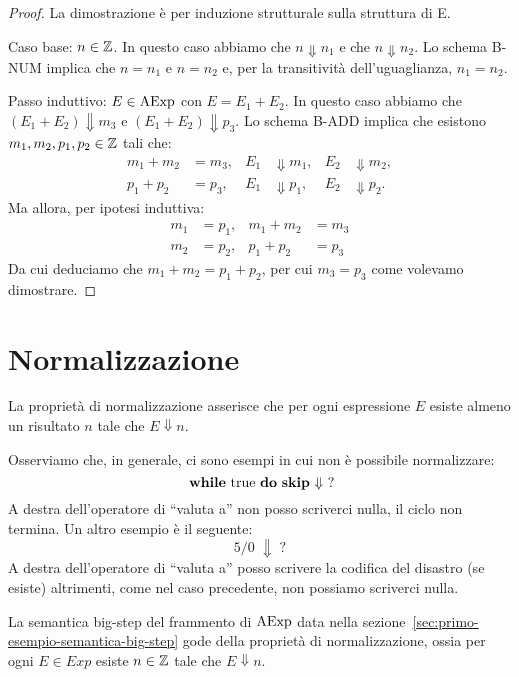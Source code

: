 \begin{proof}
La dimostrazione è per induzione strutturale sulla struttura di E.

Caso base: $n \in \mathbb{Z}$.
In questo caso abbiamo che $n \Downarrow n_1$ e che $n \Downarrow n_2$.
Lo schema B-NUM implica che $n = n_1$ e $n = n_2$ e,
per la transitività dell'uguaglianza, $n_1 = n_2$.

Passo induttivo: $E \in \mathrm{AExp}$ con $E = E_1 + E_2$.
In questo caso abbiamo che $(E_1 + E_2) \Downarrow m_3$
e $(E_1 + E_2) \Downarrow p_3$.
Lo schema B-ADD implica che esistono
$m_1, m_2, p_1, p_2 \in \mathbb{Z}$ tali che:
\begin{align*}
  m_1 + m_2 &= m_3, & E_1 &\Downarrow m_1, & E_2 &\Downarrow m_2, \\
  p_1 + p_2 &= p_3, & E_1 &\Downarrow p_1, & E_2 &\Downarrow p_2.
\end{align*}
Ma allora, per ipotesi induttiva:
\begin{align*}
m_1 &= p_1, & m_1+m_2 &= m_3 \\
m_2 &= p_2, & p_1 + p_2 &= p_3
\end{align*}
Da cui deduciamo che $ m_1 + m_2 = p_1 + p_2$, per cui
$m_3 = p_3$ come volevamo dimostrare.
\end{proof}

\section{Normalizzazione}
La proprietà di normalizzazione asserisce che per ogni espressione $E$ esiste almeno un risultato
$n$ tale che $E \Downarrow n$.

Osserviamo che, in generale, ci sono esempi in cui non è possibile normalizzare:
\[ \textrm{ $\mathop{\textup{\textbf{while}}}$ true $\mathop{\textup{\textbf{do}}}$ $\mathop{\textup{\textbf{skip}}}$ $\Downarrow$ ?} \]
A destra dell'operatore di ``valuta a'' non posso scriverci nulla, il ciclo non termina.
Un altro esempio è il seguente:
\[ 5/0 \; \Downarrow \; ? \]
A destra dell'operatore di ``valuta a'' posso scrivere la codifica del disastro (se esiste)
altrimenti, come nel caso precedente, non possiamo scriverci nulla.

\begin{teorema}[Normalizzazione]
La semantica big-step del frammento di $\mathrm{AExp}$ data nella
sezione~\textup{\ref{sec:primo-esempio-semantica-big-step}}
gode della proprietà di normalizzazione, ossia per ogni
$E \in Exp$ esiste  $n \in \mathbb{Z}$ tale che $E \Downarrow n$.
\end{teorema}

